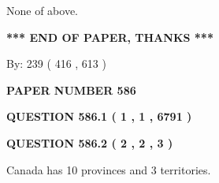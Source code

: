\documentclass[12pt]{article}
\begin{document}
  
 
 
\noindent{}
 
 
 None of above.
 
 
 
 
   
   
 \vspace{0.2in}
 
   
   
   
   
\vspace{1.0in} 
{\textbf{\large{ *** END OF PAPER, THANKS *** }}} 
   
   
\hspace{1.0in} By: 
 239 ( 416 ,  613 )
   
   
   
   
\newpage 
\setcounter{page}{ 
   586001 } 
   
   
   
   
 {\textbf{ \Large{ PAPER NUMBER  586  }}}
   
   
\vspace{0.2in}
   
   
   
   
   
   
 \vspace{0.2in}
 
 
 
 
   
   
  
\vspace{0.2in}
  
{\textbf{\Large{QUESTION
586.1 
 ( 1 , 1 , 6791 )
}}}
  
  
  
\vspace{0.2in}
  
{\textbf{\Large{QUESTION
586.2 
 ( 2 , 2 , 3 )
}}}
  
  
 
 
\noindent{}
 
 
Canada has 10  provinces and 3 territories.
 
 
 
 
   
   
 \vspace{0.2in}
 
\end{document}
